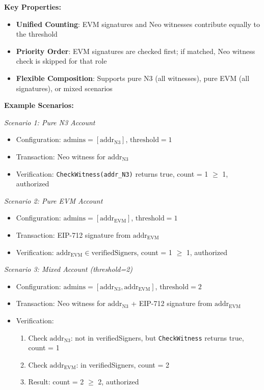 \documentclass[10pt,twocolumn]{article}
\newcommand{\code}[1]{\texttt{\small #1}}
\begin{document}
{\textbf{Key Properties:}

\begin{itemize}[leftmargin=*,topsep=2pt,itemsep=1pt]
\item \textbf{Unified Counting}: EVM signatures and Neo witnesses contribute equally to the threshold
\item \textbf{Priority Order}: EVM signatures are checked first; if matched, Neo witness check is skipped for that role
\item \textbf{Flexible Composition}: Supports pure N3 (all witnesses), pure EVM (all signatures), or mixed scenarios
\end{itemize}

\textbf{Example Scenarios:}

\textit{Scenario 1: Pure N3 Account}
\begin{itemize}[leftmargin=*,topsep=2pt,itemsep=1pt]
\item Configuration: $\text{admins} = [\text{addr}_{\text{N3}}]$, $\text{threshold} = 1$
\item Transaction: Neo witness for $\text{addr}_{\text{N3}}$
\item Verification: \code{CheckWitness(addr\_N3)} returns true, count = 1 $\geq$ 1, authorized
\end{itemize}

\textit{Scenario 2: Pure EVM Account}
\begin{itemize}[leftmargin=*,topsep=2pt,itemsep=1pt]
\item Configuration: $\text{admins} = [\text{addr}_{\text{EVM}}]$, $\text{threshold} = 1$
\item Transaction: EIP-712 signature from $\text{addr}_{\text{EVM}}$
\item Verification: $\text{addr}_{\text{EVM}} \in \text{verifiedSigners}$, count = 1 $\geq$ 1, authorized
\end{itemize}

\textit{Scenario 3: Mixed Account (threshold=2)}
\begin{itemize}[leftmargin=*,topsep=2pt,itemsep=1pt]
\item Configuration: $\text{admins} = [\text{addr}_{\text{N3}}, \text{addr}_{\text{EVM}}]$, $\text{threshold} = 2$
\item Transaction: Neo witness for $\text{addr}_{\text{N3}}$ + EIP-712 signature from $\text{addr}_{\text{EVM}}$
\item Verification: 
  \begin{enumerate}[leftmargin=*,topsep=2pt,itemsep=1pt]
  \item Check $\text{addr}_{\text{N3}}$: not in verifiedSigners, but \code{CheckWitness} returns true, count = 1
  \item Check $\text{addr}_{\text{EVM}}$: in verifiedSigners, count = 2
  \item Result: count = 2 $\geq$ 2, authorized
  \end{enumerate}
\end{itemize}

}
\end{document}
